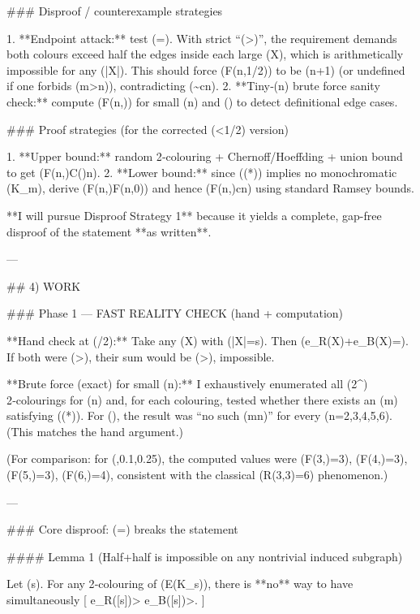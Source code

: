 ### Disproof / counterexample strategies

1. **Endpoint attack:** test (\alpha=). With strict “(>)”, the requirement demands both colours exceed half the edges inside each large (X), which is arithmetically impossible for any (|X|). This should force (F(n,1/2)) to be (n+1) (or undefined if one forbids (m>n)), contradicting (\sim c\log n).
2. **Tiny‑(n) brute force sanity check:** compute (F(n,\alpha)) for small (n) and (\alpha) to detect definitional edge cases.

### Proof strategies (for the corrected (\alpha<1/2) version)

1. **Upper bound:** random 2‑colouring + Chernoff/Hoeffding + union bound to get (F(n,\alpha)\le C(\alpha)\log n).
2. **Lower bound:** since ((*)) implies no monochromatic (K_m), derive (F(n,\alpha)\ge F(n,0)) and hence (F(n,\alpha)\ge c\log n) using standard Ramsey bounds.

**I will pursue Disproof Strategy 1** because it yields a complete, gap-free disproof of the statement **as written**.

---

## 4) WORK

### Phase 1 — FAST REALITY CHECK (hand + computation)

**Hand check at (/2):**
Take any (X) with (|X|=s). Then (e_R(X)+e_B(X)=). If both were (>), their sum would be (>), impossible.

**Brute force (exact) for small (n):**
I exhaustively enumerated all (2^{}) 2‑colourings for (n) and, for each colouring, tested whether there exists an (m) satisfying ((*)).
For (), the result was “no such (m\le n)” for every (n=2,3,4,5,6). (This matches the hand argument.)

(For comparison: for (,0.1,0.25), the computed values were (F(3,\alpha)=3), (F(4,\alpha)=3), (F(5,\alpha)=3), (F(6,\alpha)=4), consistent with the classical (R(3,3)=6) phenomenon.)

---

### Core disproof: (\alpha=) breaks the statement

#### Lemma 1 (Half+half is impossible on any nontrivial induced subgraph)

Let (s). For any 2‑colouring of (E(K_s)), there is **no** way to have simultaneously
[
e_R([s])>
\quad{}\quad
e_B([s])>.
]

